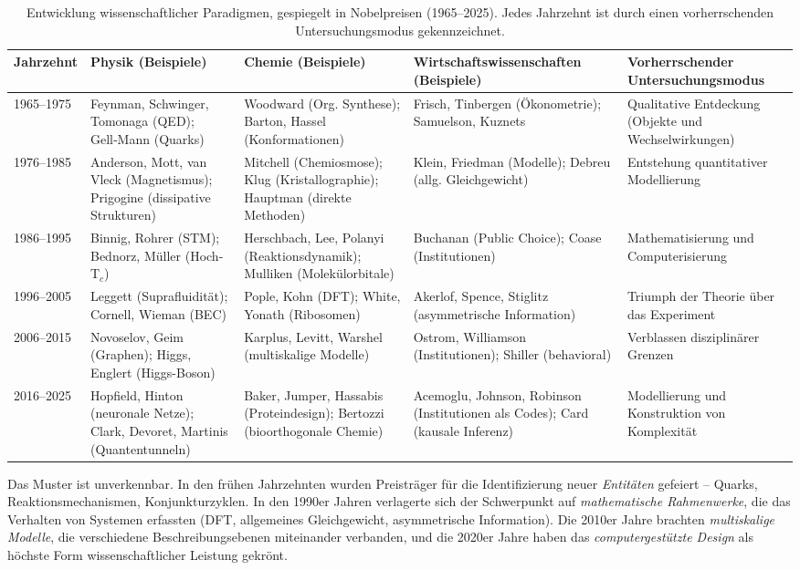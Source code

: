 \documentclass[12pt,a4paper]{article}
\begin{document}
	\begin{table}[htbp]
		\centering
		\caption{Entwicklung wissenschaftlicher Paradigmen, gespiegelt in Nobelpreisen (1965–2025). Jedes Jahrzehnt ist durch einen vorherrschenden Untersuchungsmodus gekennzeichnet.}
		\label{tab:nobel}
		\small
		\begin{tabular}{p{2.5cm}p{3.5cm}p{3.5cm}p{2.5cm}p{2.8cm}}
			\toprule
			\textbf{Jahrzehnt} & \textbf{Physik (Beispiele)} & \textbf{Chemie (Beispiele)} & \textbf{Wirtschaftswissenschaften (Beispiele)} & \textbf{Vorherrschender Untersuchungsmodus} \\
			\midrule
			1965–1975 & Feynman, Schwinger, Tomonaga (QED); Gell‑Mann (Quarks) & Woodward (Org. Synthese); Barton, Hassel (Konformationen) & Frisch, Tinbergen (Ökonometrie); Samuelson, Kuznets & Qualitative Entdeckung (Objekte und Wechselwirkungen) \\
			1976–1985 & Anderson, Mott, van Vleck (Magnetismus); Prigogine (dissipative Strukturen) & Mitchell (Chemiosmose); Klug (Kristallographie); Hauptman (direkte Methoden) & Klein, Friedman (Modelle); Debreu (allg. Gleichgewicht) & Entstehung quantitativer Modellierung \\
			1986–1995 & Binnig, Rohrer (STM); Bednorz, Müller (Hoch-T$_c$) & Herschbach, Lee, Polanyi (Reaktionsdynamik); Mulliken (Molekülorbitale) & Buchanan (Public Choice); Coase (Institutionen) & Mathematisierung und Computerisierung \\
			1996–2005 & Leggett (Suprafluidität); Cornell, Wieman (BEC) & Pople, Kohn (DFT); White, Yonath (Ribosomen) & Akerlof, Spence, Stiglitz (asymmetrische Information) & Triumph der Theorie über das Experiment \\
			2006–2015 & Novoselov, Geim (Graphen); Higgs, Englert (Higgs-Boson) & Karplus, Levitt, Warshel (multiskalige Modelle) & Ostrom, Williamson (Institutionen); Shiller (behavioral) & Verblassen disziplinärer Grenzen \\
			2016–2025 & Hopfield, Hinton (neuronale Netze); Clark, Devoret, Martinis (Quantentunneln) & Baker, Jumper, Hassabis (Proteindesign); Bertozzi (bioorthogonale Chemie) & Acemoglu, Johnson, Robinson (Institutionen als Codes); Card (kausale Inferenz) & Modellierung und Konstruktion von Komplexität \\
			\bottomrule
		\end{tabular}
	\end{table}
	
	Das Muster ist unverkennbar. In den frühen Jahrzehnten wurden Preisträger für die Identifizierung neuer \emph{Entitäten} gefeiert – Quarks, Reaktionsmechanismen, Konjunkturzyklen. In den 1990er Jahren verlagerte sich der Schwerpunkt auf \emph{mathematische Rahmenwerke}, die das Verhalten von Systemen erfassten (DFT, allgemeines Gleichgewicht, asymmetrische Information). Die 2010er Jahre brachten \emph{multiskalige Modelle}, die verschiedene Beschreibungsebenen miteinander verbanden, und die 2020er Jahre haben das \emph{computergestützte Design} als höchste Form wissenschaftlicher Leistung gekrönt.
	
\end{document}
